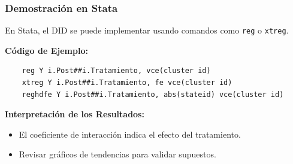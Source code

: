 \documentclass[notes,10pt,aspectratio=169]{beamer}
\begin{document}
\begin{frame}[fragile]
  \frametitle{Demostración en Stata}

  En Stata, el DID se puede implementar usando comandos como \texttt{reg} o \texttt{xtreg}.

  \vspace{1em}
  \textbf{Código de Ejemplo:}
  
  \begin{verbatim}
    reg Y i.Post##i.Tratamiento, vce(cluster id)
    xtreg Y i.Post##i.Tratamiento, fe vce(cluster id)
    reghdfe Y i.Post##i.Tratamiento, abs(stateid) vce(cluster id)
  \end{verbatim}

  \vspace{1em}
  \textbf{Interpretación de los Resultados:}
  \begin{itemize}
    \item El coeficiente de interacción indica el efecto del tratamiento.
    \item Revisar gráficos de tendencias para validar supuestos.
  \end{itemize}
\end{frame}
\end{document}

